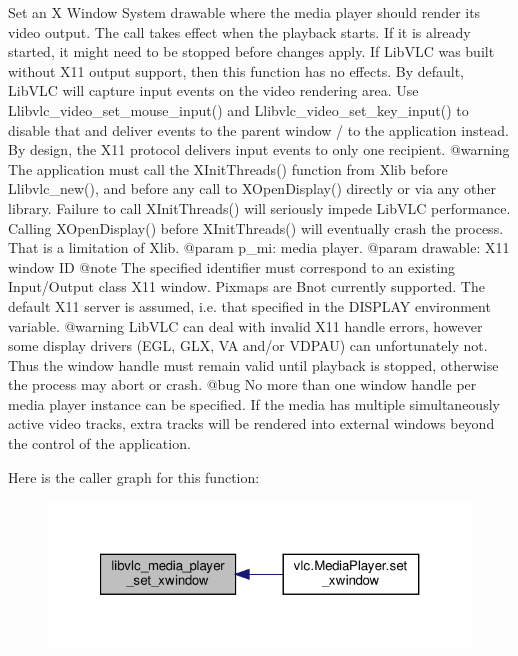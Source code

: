 \begin{DoxyVerb}Set an X Window System drawable where the media player should render its
video output. The call takes effect when the playback starts. If it is
already started, it might need to be stopped before changes apply.
If LibVLC was built without X11 output support, then this function has no
effects.
By default, LibVLC will capture input events on the video rendering area.
Use L{libvlc_video_set_mouse_input}() and L{libvlc_video_set_key_input}() to
disable that and deliver events to the parent window / to the application
instead. By design, the X11 protocol delivers input events to only one
recipient.
@warning
The application must call the XInitThreads() function from Xlib before
L{libvlc_new}(), and before any call to XOpenDisplay() directly or via any
other library. Failure to call XInitThreads() will seriously impede LibVLC
performance. Calling XOpenDisplay() before XInitThreads() will eventually
crash the process. That is a limitation of Xlib.
@param p_mi: media player.
@param drawable: X11 window ID @note The specified identifier must correspond to an existing Input/Output class X11 window. Pixmaps are B{not} currently supported. The default X11 server is assumed, i.e. that specified in the DISPLAY environment variable. @warning LibVLC can deal with invalid X11 handle errors, however some display drivers (EGL, GLX, VA and/or VDPAU) can unfortunately not. Thus the window handle must remain valid until playback is stopped, otherwise the process may abort or crash.
@bug No more than one window handle per media player instance can be specified. If the media has multiple simultaneously active video tracks, extra tracks will be rendered into external windows beyond the control of the application.
\end{DoxyVerb}
 Here is the caller graph for this function\+:
\nopagebreak
\begin{figure}[H]
\begin{center}
\leavevmode
\includegraphics[width=321pt]{namespacevlc_a9f137196660c7428467e8275ebebe8b6_icgraph}
\end{center}
\end{figure}
\mbox{\label{namespacevlc_a66bcd32fe71f703084d52d175874f6e1}} 
